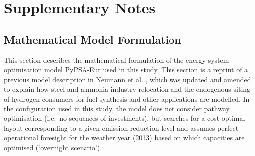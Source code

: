
\section{Supplementary Notes}

\subsection{Mathematical Model Formulation}
\label{sec:si:math}

This section describes the mathematical formulation of the energy system
optimisation model PyPSA-Eur used in this study. This section is a reprint of a
previous model description in Neumann et al.
\cite{neumannPotentialRoleHydrogen2023}, which was updated and amended to
explain how steel and ammonia industry relocation and the endogenous siting of
hydrogen consumers for fuel synthesis and other applications are modelled. In
the configuration used in this study, the model does not consider pathway
optimisation (i.e.~no sequences of investments), but searches for a cost-optimal
layout corresponding to a given \co emission reduction level and assumes perfect
operational foresight for the weather year (2013) based on which capacities are
optimised (`overnight scenario').


